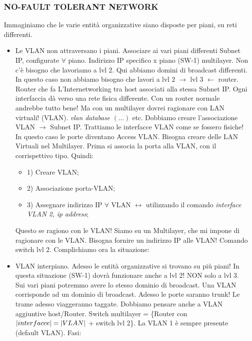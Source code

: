 \subsubsection{NO-FAULT TOLERANT NETWORK}

Immaginiamo che le varie entità organizzative siano disposte per piani, su reti differenti.

\begin{itemize}

\item Le VLAN non attraversano i piani. Associare ai vari piani differenti Subnet IP, configurate $\forall$ piano. Indirizzo IP specifico x piano (SW-1) multilayer. Non c'è bisogno che lavoriamo a lvl 2. Qui abbiamo domini di broadcast differenti. In questo caso non abbiamo bisogno che lavori a lvl 2 $\rightarrow$ lvl 3 $\leftarrow$ router. Router che fa L'Internetworking tra host associati alla stessa Subnet IP. Ogni interfaccia dà verso una rete fisica differente. Con un router normale andrebbe tutto bene! Ma con un multilayer dovrei ragionare con LAN virtuali! (VLAN). \textit{vlan database $(\dots)$} etc. Dobbiamo creare l'associazione VLAN $\rightarrow$ Subnet IP. Trattiamo le interfacce VLAN come se fossero fisiche! In questo caso le porte diventano Access VLAN. Bisogna creare delle LAN Virtuali nel Multilayer. Prima si associa la porta alla VLAN, con il corrispettivo tipo. Quindi:

\begin{itemize}

\item{1)} Creare VLAN;
\item{2)} Associazione porta-VLAN;
\item{3)} Assegnare indirizzo IP $\forall$ VLAN $\leftrightarrow$ utilizzando il comando \textit{interface VLAN 2, ip address};

\end{itemize}

Questo se ragiono con le VLAN! Siamo su un Multilayer, che mi impone di ragionare con le VLAN. Bisogna fornire un indirizzo IP alle VLAN! Comando switch lvl 2. Complichiamo ora la situazione:

\item VLAN interpiano. Adesso le entità organizzative si trovano su più piani! In questa situazione (SW-1) dovrà funzionare anche a lvl 2! NON solo a lvl 3. Sui vari piani potremmo avere lo stesso dominio di broadcast. Una VLAN corrisponde ad un dominio di broadcast. Adesso le porte saranno trunk! Le trame adesso viaggeranno taggate. Dobbiamo pensare anche a VLAN aggiuntive host/Router. Switch multilayer = \{Router con $\left\vert{interfacce}\right\vert=\left\vert{VLAN}\right\vert$ + switch lvl 2\}. La VLAN 1 è sempre presente (default VLAN). Fasi:


\end{itemize}
